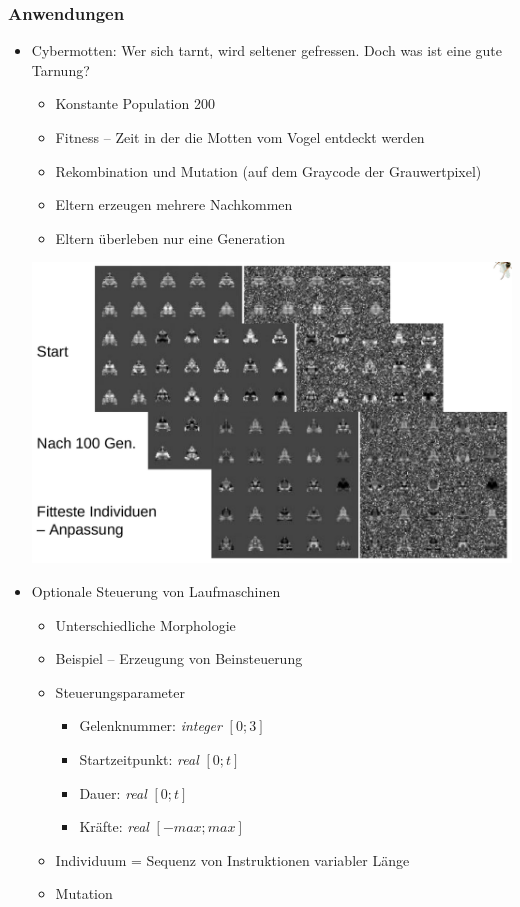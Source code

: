 \subsubsection{Anwendungen}
\begin{itemize}
	\item Cybermotten: Wer sich tarnt, wird seltener gefressen. Doch was ist eine gute Tarnung?
	\begin{itemize}
		\item Konstante Population 200
		\item Fitness -- Zeit in der die Motten vom Vogel entdeckt werden
		\item Rekombination und Mutation (auf dem Graycode der Grauwertpixel)
		\item Eltern erzeugen mehrere Nachkommen
		\item Eltern \glqq überleben\grqq{} nur eine Generation
	\end{itemize}
	\begin{center}
	\includegraphics[width=.5\textwidth]{figures/cybermotten.png}
	\end{center}
	\item Optionale Steuerung von Laufmaschinen
	\begin{itemize}
		\item Unterschiedliche Morphologie
		\item Beispiel -- Erzeugung von Beinsteuerung
		\item Steuerungsparameter
		\begin{itemize}
			\item Gelenknummer: \textit{integer} $[0;3]$
			\item Startzeitpunkt: \textit{real} $[0;t]$
			\item Dauer: \textit{real} $[0;t]$
			\item Kräfte: \textit{real} $[-max;max]$
		\end{itemize}
		\item Individuum = Sequenz von Instruktionen variabler Länge
		\item Mutation
		\begin{itemize}

\end{itemize}
\end{itemize}
\end{itemize}

